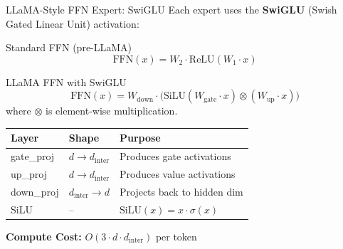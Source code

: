 \documentclass[aspectratio=169,10pt]{beamer}
\begin{document}
\begin{frame}{LLaMA-Style FFN Expert: SwiGLU}
    Each expert uses the \textbf{SwiGLU} (Swish Gated Linear Unit) activation:

    \vspace{0.2cm}
    \begin{block}{Standard FFN (pre-LLaMA)}
        $$\text{FFN}(x) = W_2 \cdot \text{ReLU}(W_1 \cdot x)$$
    \end{block}

    \vspace{0.2cm}
    \begin{block}{LLaMA FFN with SwiGLU}
        $$\text{FFN}(x) = W_{\text{down}} \cdot \Big(\text{SiLU}(W_{\text{gate}} \cdot x) \otimes (W_{\text{up}} \cdot x)\Big)$$
        where $\otimes$ is element-wise multiplication.
    \end{block}

    \vspace{0.2cm}
    \begin{table}
        \centering
        \small
        \begin{tabular}{lll}
            \toprule
            \textbf{Layer} & \textbf{Shape} & \textbf{Purpose} \\
            \midrule
            gate\_proj & $d \to d_{\text{inter}}$ & Produces gate activations \\
            up\_proj & $d \to d_{\text{inter}}$ & Produces value activations \\
            down\_proj & $d_{\text{inter}} \to d$ & Projects back to hidden dim \\
            SiLU & -- & $\text{SiLU}(x) = x \cdot \sigma(x)$ \\
            \bottomrule
        \end{tabular}
    \end{table}

    \vspace{0.3cm}
    \textbf{Compute Cost:} $O(3 \cdot d \cdot d_{\text{inter}})$ per token
\end{frame}
\end{document}
